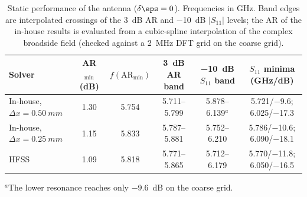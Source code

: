 \begin{table}[t]
\centering
\caption{Static performance of the antenna ($\delta\eps=0$). Frequencies in GHz. Band edges are interpolated crossings of the \SI{3}{dB} AR and \SI{-10}{dB} $|S_{11}|$ levels; the AR of the in-house results is evaluated from a cubic-spline interpolation of the complex broadside field (checked against a \SI{2}{MHz} DFT grid on the coarse grid).}
\label{tab:static}
\footnotesize
\setlength{\tabcolsep}{3.5pt}
\begin{tabular}{@{}lccccc@{}}
\toprule
Solver & AR$_{\min}$ (dB) & $f(\mathrm{AR}_{\min})$ & \SI{3}{dB} AR band & \SI{-10}{dB} $S_{11}$ band & $S_{11}$ minima (GHz/dB) \\
\midrule
In-house, $\Delta x=\SI{0.50}{mm}$ & 1.30 & 5.754 & 5.711--5.799 & 5.878--6.139$^{a}$ & 5.721/$-$9.6; 6.025/$-$17.3 \\
In-house, $\Delta x=\SI{0.25}{mm}$ & 1.15 & 5.833 & 5.787--5.881 & 5.752--6.210 & 5.786/$-$10.6; 6.090/$-$18.1 \\
HFSS & 1.09 & 5.818 & 5.771--5.865 & 5.712--6.179 & 5.770/$-$11.8; 6.050/$-$16.5 \\
\bottomrule
\end{tabular}

\smallskip
\footnotesize $^{a}$The lower resonance reaches only \SI{-9.6}{dB} on the coarse grid.
\end{table}
